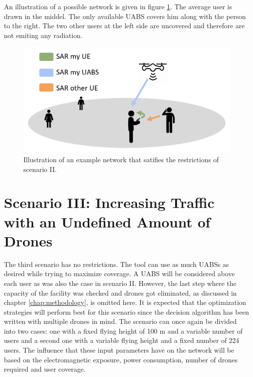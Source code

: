 An illustration of a possible network is given in figure \ref{fig:IllustrationS2}. The average user is drawn in the middel. The only available \gls{UABS} covers him along with the person to the right.
The two other  users at the left side are uncovered and therefore are not  emiting any radiation.
\begin{figure}[H]
\centering
  \includegraphics[width=\textwidth/5*4]{../images/IllustrationS2.png}
  \caption{Illustration of an example network that satifies the restrictions of scenario II.}
  \label{fig:IllustrationS2}
\end{figure}


\section{Scenario III: Increasing Traffic with an Undefined Amount of Drones}


The third scenario has no restrictions. The tool can use as much \gls{UABS}s as desired while trying to maximize coverage. 
A \gls{UABS} will be considered above each user as was also the case in scenario II. However, the last step where the capacity of the facility
was checked and drones got eliminated, as discussed in chapter \ref{chap:methodology}, is omitted here. It is expected that the optimization strategies will perform best for this scenario since the decision algorithm has been written
 with multiple drones in mind.
The scenario can once again be divided into two cases: one with a fixed flying height of 100 m and a variable number of users and a second one with 
a variable flying height and a fixed number of 224 users.
The influence that these input parameters have on the network will be based on the electromagnetic exposure, power consumption, number of drones required and user coverage.

